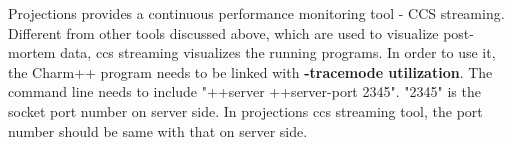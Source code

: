 Projections provides a continuous performance monitoring tool - CCS streaming. 
Different from other tools discussed above, which are used to visualize post-mortem data, 
ccs streaming visualizes the running programs. In order to use it, the Charm++
program needs to be linked with \textbf{-tracemode utilization}.
The command line needs to include "++server ++server-port 2345". "2345" is 
the socket port number on server side.
In projections ccs streaming tool, the port number should be same with that on server side.

